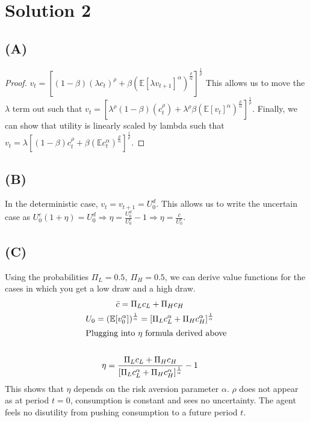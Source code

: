\documentclass[10pt,a4paper]{article}
\begin{document}
\section*{Solution 2}
  \subsection*{(A)}
    \begin{proof}
      $v_t = [(1-\beta)(\lambda c_t)^{\rho} + \beta(\mathbb{E}[\lambda v_{t+1}]^{\alpha})^{\frac{\rho}{\alpha}}]^{\frac{1}{\rho}}$  This allows us to move the $\lambda$ term out such that $v_t = [\lambda^{\rho}(1-\beta)(c_t^{\rho}) + \lambda^{\rho}\beta(\mathbb{E}[v_t]^{\alpha})^{\frac{\rho}{\alpha}}]^{\frac{1}{\rho}}$. Finally, we can show that utility is linearly scaled by lambda such that $v_t = \lambda[(1-\beta)c_t^{\rho}+\beta(\mathbb{E}c_t^{\alpha})^{\frac{\rho}{\alpha}}]^{\frac{1}{\rho}}$.
    \end{proof}
  \subsection*{(B)}
    In the deterministic case, $v_t=v_{t+1}=U_0^d$. This allows us to write the uncertain case as $U_0^c(1+\eta)=U_0^d \Rightarrow \eta=\frac{U_0^d}{U_0^c}-1\Rightarrow \eta = \frac{\bar{c}}{U_0^c}$. 
  \subsection*{(C)}
    Using the probabilities $\Pi_L = 0.5, \ \Pi_H = 0.5$, we can derive value functions for the cases in which you get a low draw and a high draw.
    \begin{gather*}
      \bar{c} = \Pi_Lc_L + \Pi_Hc_H \\
      U_0 = (\mathbb{E}[v_0^{\alpha}])^{\frac{1}{\alpha}} = [\Pi_Lc_L^{\alpha} + \Pi_Hc_H^{\alpha}]^{\frac{1}{\alpha}} \\
      \shortintertext{Plugging into $\eta$ formula derived above} \\
      \eta = \frac{\Pi_Lc_L + \Pi_Hc_H}{[\Pi_Lc_L^{\alpha} + \Pi_Hc_H^{\alpha}]^{\frac{1}{\alpha}}} -1 \\
    \end{gather*}
    This shows that $\eta$ depends on the risk aversion parameter $\alpha$. $\rho$ does not appear as at period $t=0$, consumption is constant and sees no uncertainty. The agent feels no disutility from pushing consumption to a future period $t$. 
\end{document}
